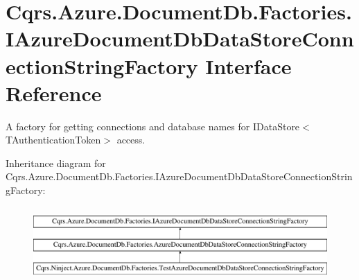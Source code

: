 \hypertarget{interfaceCqrs_1_1Azure_1_1DocumentDb_1_1Factories_1_1IAzureDocumentDbDataStoreConnectionStringFactory}{}\section{Cqrs.\+Azure.\+Document\+Db.\+Factories.\+I\+Azure\+Document\+Db\+Data\+Store\+Connection\+String\+Factory Interface Reference}
\label{interfaceCqrs_1_1Azure_1_1DocumentDb_1_1Factories_1_1IAzureDocumentDbDataStoreConnectionStringFactory}


A factory for getting connections and database names for I\+Data\+Store$<$\+T\+Authentication\+Token$>$ access.  


Inheritance diagram for Cqrs.\+Azure.\+Document\+Db.\+Factories.\+I\+Azure\+Document\+Db\+Data\+Store\+Connection\+String\+Factory\+:\begin{figure}[H]
\begin{center}
\leavevmode
\includegraphics[height=2.847458cm]{interfaceCqrs_1_1Azure_1_1DocumentDb_1_1Factories_1_1IAzureDocumentDbDataStoreConnectionStringFactory}
\end{center}
\end{figure}
